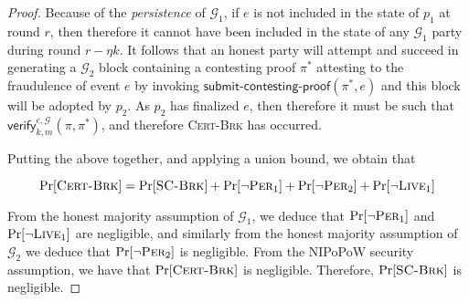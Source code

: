 \begin{proof}
  Because of the \emph{persistence} of $\mathcal{G}_1$, if $e$ is not included
  in the state of $p_1$ at round $r$, then therefore it cannot have been
  included in the state of any $\mathcal{G}_1$ party during round $r - \eta k$.
  It follows that an honest party will attempt and succeed in generating a
  $\mathcal{G}_2$ block containing a contesting proof $\pi^*$ attesting to the
  fraudulence of event $e$ by invoking
  $\textsf{submit-contesting-proof}(\pi^*, e)$ and this block will be adopted by
  $p_2$. As $p_2$ has finalized $e$, then therefore it must be such that
  $\textsf{verify}^{e, \mathcal{G}}_{k,m}(\pi, \pi^*)$, and therefore
  \textsc{Cert-Brk} has occurred.

  Putting the above together, and applying a union bound, we obtain that

  \[
  \Pr[\textsc{Cert-Brk}] = \Pr[\textsc{SC-Brk}]
                         + \Pr[\lnot \textsc{Per}_1]
                         + \Pr[\lnot \textsc{Per}_2]
                         + \Pr[\lnot \textsc{Live}_1]
  \]

  From the honest majority assumption of $\mathcal{G}_1$, we deduce that
  $\Pr[\lnot \textsc{Per}_1]$ and $\Pr[\lnot \textsc{Live}_1]$ are negligible,
  and similarly from the honest majority assumption of $\mathcal{G}_2$ we deduce
  that $\Pr[\lnot \textsc{Per}_2]$ is negligible. From the NIPoPoW security
  assumption, we have that $\Pr[\textsc{Cert-Brk}]$ is negligible. Therefore,
  $\Pr[\textsc{SC-Brk}]$ is negligible.
\end{proof}
